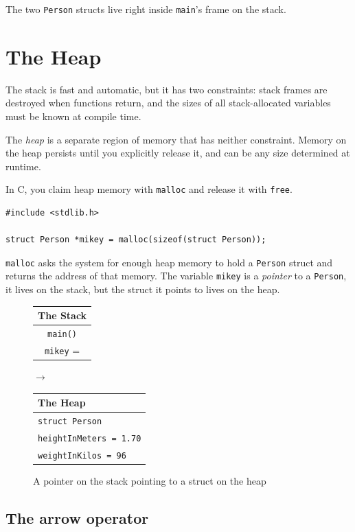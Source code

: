 The two \texttt{Person} structs live right inside \texttt{main}'s
frame on the stack.

\section{The Heap}

The stack is fast and automatic, but it has two constraints: stack frames
are destroyed when functions return, and the sizes of all stack-allocated
variables must be known at compile time.

The \emph{heap} is a separate region of memory that has neither
constraint.  Memory on the heap persists until you explicitly release
it, and can be any size determined at runtime.

In C, you claim heap memory with \texttt{malloc} and
release it with \texttt{free}.

\begin{verbatim}
#include <stdlib.h>

struct Person *mikey = malloc(sizeof(struct Person));
\end{verbatim}

\texttt{malloc} asks the system for enough heap memory to hold a
\texttt{Person} struct and returns the address of that memory.
The variable \texttt{mikey} is a \emph{pointer} to a \texttt{Person},
it lives on the stack, but the struct it points to lives on the heap.

\begin{figure}[h]
\centering
\begin{tabular}{|c|}
\hline
\textbf{The Stack} \\
\hline
\texttt{main()} \\
\texttt{mikey} = \framebox{\strut\quad} \\
\hline
\end{tabular}
\quad $\longrightarrow$ \quad
\begin{tabular}{|l|}
\hline
\textbf{The Heap} \\
\hline
\texttt{struct Person} \\
\texttt{heightInMeters = 1.70} \\
\texttt{weightInKilos = 96} \\
\hline
\end{tabular}
\caption{A pointer on the stack pointing to a struct on the heap}
\end{figure}

\subsection{The arrow operator}

